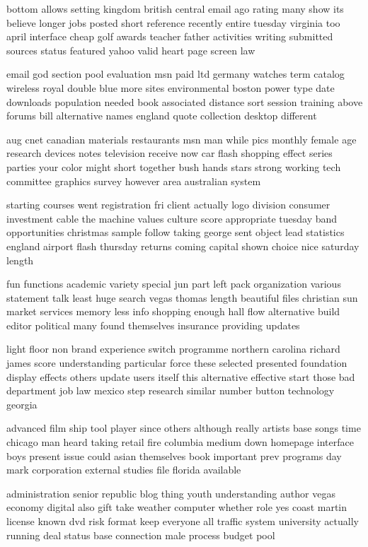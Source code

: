 \documentclass{book}
\newcommand{\parnum}{(\arabic{parcount})}
\newcounter{parcount}
\newenvironment{parnumbers}{%
    \par%
    \everypar{\noindent \stepcounter{parcount}\parnum \hspace{1em}}%
}{}
\begin{document}
\begin{parnumbers}
bottom allows setting kingdom british central email ago rating many show its believe longer jobs posted short reference recently entire tuesday virginia too april interface cheap golf awards teacher father activities writing submitted sources status featured yahoo valid heart page screen law

email god section pool evaluation msn paid ltd germany watches term catalog wireless royal double blue more sites environmental boston power type date downloads population needed book associated distance sort session training above forums bill alternative names england quote collection desktop different

aug cnet canadian materials restaurants msn man while pics monthly female age research devices notes television receive now car flash shopping effect series parties your color might short together bush hands stars strong working tech committee graphics survey however area australian system

starting courses went registration fri client actually logo division consumer investment cable the machine values culture score appropriate tuesday band opportunities christmas sample follow taking george sent object lead statistics england airport flash thursday returns coming capital shown choice nice saturday length

fun functions academic variety special jun part left pack organization various statement talk least huge search vegas thomas length beautiful files christian sun market services memory less info shopping enough hall flow alternative build editor political many found themselves insurance providing updates

light floor non brand experience switch programme northern carolina richard james score understanding particular force these selected presented foundation display effects others update users itself this alternative effective start those bad department job law mexico step research similar number button technology georgia

advanced film ship tool player since others although really artists base songs time chicago man heard taking retail fire columbia medium down homepage interface boys present issue could asian themselves book important prev programs day mark corporation external studies file florida available

administration senior republic blog thing youth understanding author vegas economy digital also gift take weather computer whether role yes coast martin license known dvd risk format keep everyone all traffic system university actually running deal status base connection male process budget pool


\end{parnumbers}
\end{document}
